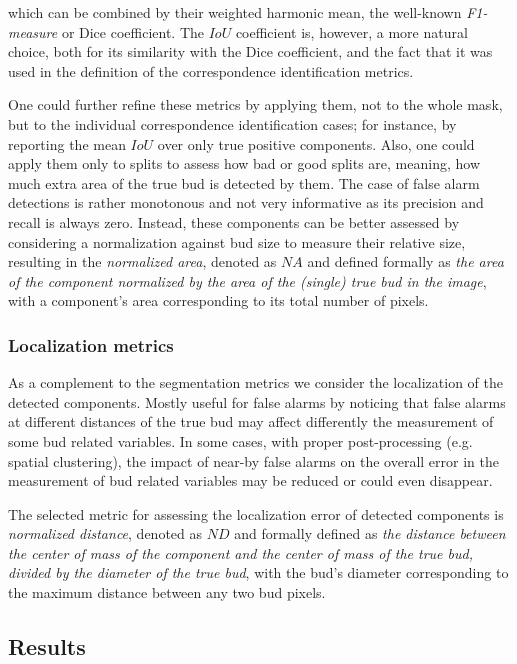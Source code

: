 \documentclass[a4paper,authoryear,review]{elsarticle}
\begin{document}
	which can be combined by their weighted harmonic mean, the well-known \emph{F1-measure} or Dice coefficient. The $IoU$ coefficient is, however, a more natural choice, both for its similarity with the Dice coefficient, and the fact that it was used in the definition of the correspondence identification metrics. 
	
	One could further refine these metrics by applying them, not to the whole mask, but to the individual correspondence identification cases; for instance, by reporting the mean $IoU$ over only true positive components. Also, one could apply them only to splits to assess how bad or good splits are, meaning, how much extra area of the true bud is detected by them. The case of false alarm detections is rather monotonous and not very informative as its precision and recall is always zero. Instead, these components can be better assessed by considering a normalization against bud size to measure their relative size, resulting in the \emph{normalized area}, denoted as $NA$ and defined formally as \emph{the area of the component normalized by the area of the (single) true bud in the image}, with a component’s area corresponding to its total number of pixels. 
	
	
	
	\subsubsection{Localization metrics}
	\label{subsec:locmetrics}
	
	As a complement to the segmentation metrics we consider the localization of the detected components. Mostly useful for false alarms by noticing that false alarms at different distances of the true bud may affect differently the measurement of some bud related variables. In some cases, with proper post-processing (e.g. spatial clustering), the impact of near-by false alarms on the overall error in the measurement of bud related variables may be reduced or could even disappear. 
	
	The selected metric for assessing the localization error of detected components is \emph{normalized distance}, denoted as $ND$ and formally defined as \emph{the distance between the center of mass of the component and the center of mass of the true bud, divided by the diameter of the true bud}, with the bud’s diameter corresponding to the maximum distance between any two bud pixels.
	
	\subsection{Results}
	\label{sec:resultados}
	
\end{document}
